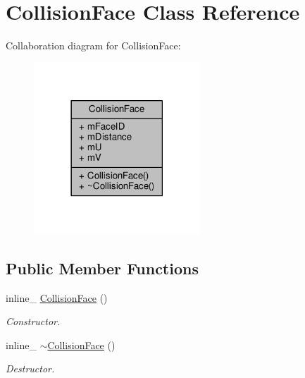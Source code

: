 \hypertarget{classCollisionFace}{}\section{Collision\+Face Class Reference}
\label{classCollisionFace}


Collaboration diagram for Collision\+Face\+:
\nopagebreak
\begin{figure}[H]
\begin{center}
\leavevmode
\includegraphics[width=177pt]{d0/d0e/classCollisionFace__coll__graph}
\end{center}
\end{figure}
\subsection*{Public Member Functions}
\begin{DoxyCompactItemize}
\item 
inline\+\_\+ \hyperlink{classCollisionFace_a7c41bd768a480b02f5dd5c4969472db4}{Collision\+Face} ()\hypertarget{classCollisionFace_a7c41bd768a480b02f5dd5c4969472db4}{}\label{classCollisionFace_a7c41bd768a480b02f5dd5c4969472db4}

\begin{DoxyCompactList}\small\item\em Constructor. \end{DoxyCompactList}\item 
inline\+\_\+ \hyperlink{classCollisionFace_a1282cad4af455c6af279a59e523c27f8}{$\sim$\+Collision\+Face} ()\hypertarget{classCollisionFace_a1282cad4af455c6af279a59e523c27f8}{}\label{classCollisionFace_a1282cad4af455c6af279a59e523c27f8}

\begin{DoxyCompactList}\small\item\em Destructor. \end{DoxyCompactList}\end{DoxyCompactItemize}
